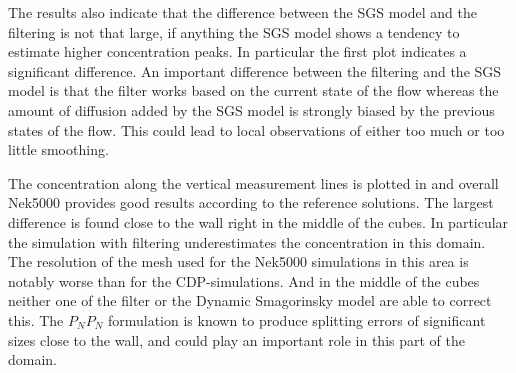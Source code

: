 The results also indicate that the difference between the SGS model and the filtering
is not that large,
if anything the SGS model shows a tendency to estimate higher concentration peaks.
In particular the first plot indicates a significant difference.
An important difference between the filtering and the SGS model is 
that the filter works based on the current state of the flow 
whereas the amount of diffusion added by the SGS model is strongly biased 
by the previous states of the flow.
This could lead to local observations of either too much or too little smoothing.

The concentration along the vertical measurement lines is plotted in  and overall 
Nek5000 provides good results according to the reference solutions. The largest difference is found close 
to the wall right in the middle of the cubes. In particular the simulation with filtering 
underestimates the concentration in this domain. The resolution of the mesh used for the 
Nek5000 simulations in this area is notably worse than for the CDP-simulations.
And in the middle of the cubes neither one of the filter or the Dynamic Smagorinsky model
are able to correct this.
The $P_NP_N$ formulation is known to produce splitting errors of significant sizes 
close to the wall, and could play an important role in this part of the domain.

